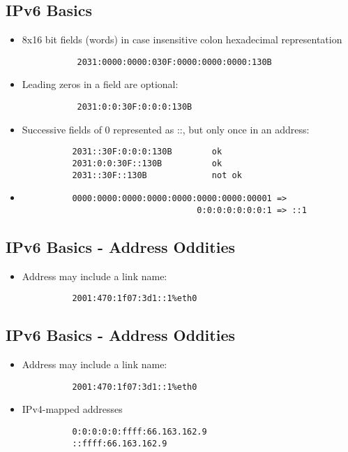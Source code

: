 \documentclass[xga]{xdvislides}
\begin{document}
\subsection{IPv6 Basics}
\begin{itemize}
	\item 8x16 bit fields (words) in case insensitive colon hexadecimal
		representation
\begin{verbatim}
           2031:0000:0000:030F:0000:0000:0000:130B
\end{verbatim}
	\item Leading zeros in a field are optional:
\begin{verbatim}
           2031:0:0:30F:0:0:0:130B
\end{verbatim}
	\item Successive fields of 0 represented as ::, but only once in
			an address:
\begin{verbatim}
          2031::30F:0:0:0:130B        ok
          2031:0:0:30F::130B          ok
          2031::30F::130B             not ok
\end{verbatim}
	\item
\begin{verbatim}
          0000:0000:0000:0000:0000:0000:0000:00001 =>
                                   0:0:0:0:0:0:0:1 => ::1
\end{verbatim}
\end{itemize}

\subsection{IPv6 Basics - Address Oddities}
\begin{itemize}
	\item Address may include a link name:
\begin{verbatim}
          2001:470:1f07:3d1::1%eth0
\end{verbatim}
\end{itemize}

\subsection{IPv6 Basics - Address Oddities}
\begin{itemize}
	\item Address may include a link name:
\begin{verbatim}
          2001:470:1f07:3d1::1%eth0
\end{verbatim}
	\item IPv4-mapped addresses
\begin{verbatim}
          0:0:0:0:0:ffff:66.163.162.9
          ::ffff:66.163.162.9
\end{verbatim}
\end{itemize}
\end{document}
